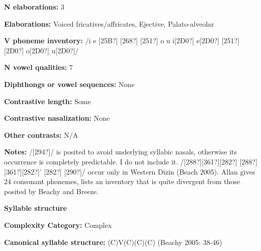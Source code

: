 \begin{styleBody}
\textbf{N elaborations:} 3
\end{styleBody}

\begin{styleBody}
\textbf{Elaborations:} Voiced fricatives/affricates, Ejective, Palato-alveolar
\end{styleBody}

\begin{styleBody}
\textbf{V phoneme inventory:} /i e [25B?] [268?] [251?] o u i[2D0?] e[2D0?] [251?][2D0?] o[2D0?] u[2D0?]/
\end{styleBody}

\begin{styleBody}
\textbf{N vowel qualities:} 7
\end{styleBody}

\begin{styleBody}
\textbf{Diphthongs or vowel sequences:} None
\end{styleBody}

\begin{styleBody}
\textbf{Contrastive length:} Some
\end{styleBody}

\begin{styleBody}
\textbf{Contrastive nasalization:} None
\end{styleBody}

\begin{styleBody}
\textbf{Other contrasts:} N/A
\end{styleBody}

\begin{styleBody}
\textbf{Notes:} /[294?]/ is posited to avoid underlying syllabic nasals, otherwise its occurrence is completely predictable. I do not include it. /[288?][361?][282?] [288?][361?][282?]’ [282?] [290?]/ occur only in Western Dizin (Beach 2005). Allan gives 24 consonant phonemes, lists an inventory that is quite divergent from those posited by Beachy and Breeze.
\end{styleBody}

\begin{styleBody}
\textbf{Syllable structure}
\end{styleBody}

\begin{styleBody}
\textbf{Complexity Category:} Complex
\end{styleBody}

\begin{styleBody}
\textbf{Canonical syllable structure:} (C)V(C)(C)(C)\textbf{ }(Beachy 2005: 38-46)
\end{styleBody}

